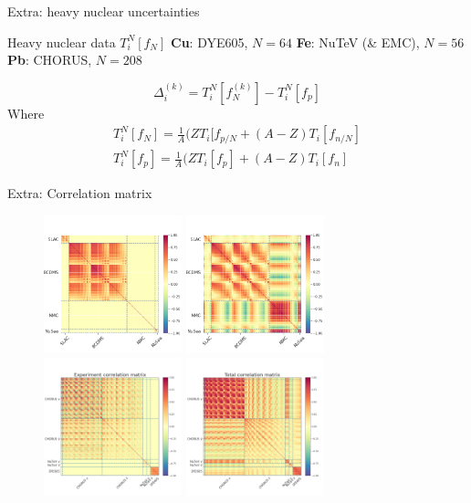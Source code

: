 \begin{frame}{Extra: heavy nuclear uncertainties}

\begin{block}{Heavy nuclear data $T_i^N[f_N]$}
{\bf Cu}: DYE605,  $N=64$
\newline
{\bf Fe}: NuTeV (\& EMC), $N=56$
\newline
{\bf Pb}: CHORUS, $N=208$
\end{block}
\begin{equation}
\Delta_i^{(k)} = T_i^{N}[f_{N}^{(k)}] - T_i^{N}[f_{p}]
\end{equation}
Where 
\begin{equation}
\begin{split}
    T_i^N[f_N] = \frac{1}{A} (ZT_i[f_{p/N} + (A-Z)T_i[f_{n/N}] \\
    T_i^N[f_p] = \frac{1}{A} (ZT_i[f_p] +  (A-Z)T_i[f_n]
\end{split}
\end{equation}
\end{frame}
\begin{frame}{Extra: Correlation matrix}
  \begin{figure}
  \centering
    \includegraphics[width=40mm]{nuclear_uncs/covexpdeut.png}
    \includegraphics[width=40mm]{nuclear_uncs/covtotdeut.png}
    \includegraphics[width=40mm]{nuclear_uncs/covexpnuc.png}
    \includegraphics[width=40mm]{nuclear_uncs/covtotnuc.png}
  \end{figure}
  \end{frame}
